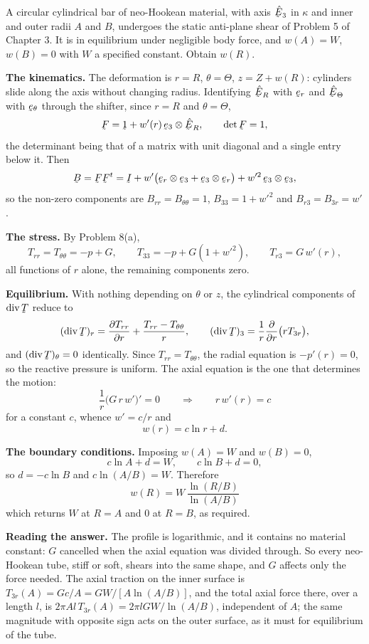 \begin{problem}
A circular cylindrical bar of neo-Hookean material, with axis $\hbE_{3}$
in $\kappa$ and inner and outer radii $A$ and $B$, undergoes the static
anti-plane shear of Problem 5 of Chapter 3. It is in equilibrium under
negligible body force, and $w(A)=W$, $w(B)=0$ with $W$ a specified
constant. Obtain $w(R)$.
\end{problem}

\begin{solution}
\textbf{The kinematics.} The deformation is $r=R$, $\theta=\Theta$,
$z=Z+w(R)$: cylinders slide along the axis without changing radius.
Identifying $\hbE_{R}$ with $\ber$ and $\hbE_{\Theta}$ with $\bet$
through the shifter, since $r=R$ and $\theta=\Theta$,
\[
   \bF=\shift+w'(r)\,\be_{3}\otimes\hbE_{R},\qquad \det\bF=1 ,
\]
the determinant being that of a matrix with unit diagonal and a single
entry below it. Then
\[
   \bB=\bF\bF^{t}=\I+w'\big(\ber\otimes\be_{3}+\be_{3}\otimes\ber\big)
   +w'^{2}\,\be_{3}\otimes\be_{3},
\]
so the non-zero components are $B_{rr}=B_{\theta\theta}=1$,
$B_{33}=1+w'^{2}$ and $B_{r3}=B_{3r}=w'$.

\textbf{The stress.} By Problem 8(a),
\[
   T_{rr}=T_{\theta\theta}=-p+G,\qquad T_{33}=-p+G(1+w'^{2}),
   \qquad T_{r3}=G\,w'(r),
\]
all functions of $r$ alone, the remaining components zero.

\textbf{Equilibrium.} With nothing depending on $\theta$ or $z$, the
cylindrical components of $\dvg\bT$ reduce to
\[
   (\dvg\bT)_{r}=\frac{\partial T_{rr}}{\partial r}
   +\frac{T_{rr}-T_{\theta\theta}}{r},
   \qquad
   (\dvg\bT)_{3}=\frac{1}{r}\frac{\partial}{\partial r}\big(rT_{3r}\big),
\]
and $(\dvg\bT)_{\theta}=0$ identically. Since $T_{rr}=T_{\theta\theta}$,
the radial equation is $-p'(r)=0$, so the reactive pressure is uniform.
The axial equation is the one that determines the motion:
\[
   \frac{1}{r}\big(G\,r\,w'\big)'=0
   \qquad\Longrightarrow\qquad r\,w'(r)=c
\]
for a constant $c$, whence $w'=c/r$ and
\[
   w(r)=c\ln r+d .
\]

\textbf{The boundary conditions.} Imposing $w(A)=W$ and $w(B)=0$,
\[
   c\ln A+d=W,\qquad c\ln B+d=0 ,
\]
so $d=-c\ln B$ and $c\ln(A/B)=W$. Therefore
\[
   \boxed{\;w(R)=W\,\frac{\ln(R/B)}{\ln(A/B)}\;}
\]
which returns $W$ at $R=A$ and $0$ at $R=B$, as required.

\textbf{Reading the answer.} The profile is logarithmic, and it contains
no material constant: $G$ cancelled when the axial equation was divided
through. So every neo-Hookean tube, stiff or soft, shears into the same
shape, and $G$ affects only the force needed. The axial traction on the
inner surface is $T_{3r}(A)=Gc/A=GW/[A\ln(A/B)]$, and the total axial
force there, over a length $l$, is $2\pi A l\,T_{3r}(A)
=2\pi lGW/\ln(A/B)$, independent of $A$; the same magnitude with
opposite sign acts on the outer surface, as it must for equilibrium of
the tube.
\end{solution}

